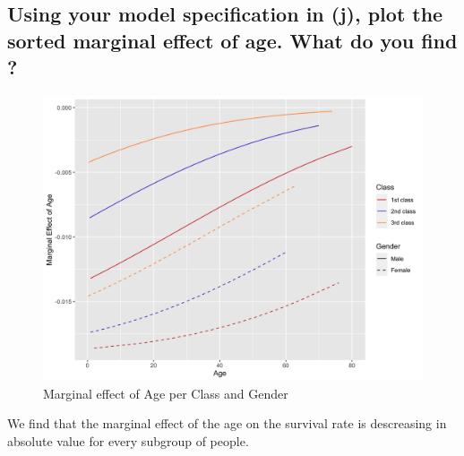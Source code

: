 \documentclass[12pt]{article}
\begin{document}
\subsection{Using your model specification in (j), plot the sorted marginal effect of age. What do you find ?}
\begin{figure}[h]
    \centering
    \includegraphics[width=1\textwidth]{OUTPUT/marginal_effect_age.png}
    \caption{Marginal effect of Age per Class and Gender}
    \label{fig:marginal_effect_age}
  \end{figure}
We find that the marginal effect of the age on the survival rate is descreasing in absolute value for every subgroup of people.
\end{document}
